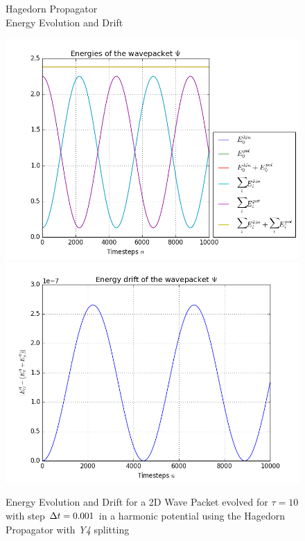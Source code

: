 \appendix

\begin{figure}
	\begin{minipage}[c]{\textwidth}
		\begin{center}
			\large Hagedorn Propagator \\[1mm]
			\normalsize Energy Evolution and Drift
			\vspace{4mm}
		\end{center}
	\end{minipage}
	\includegraphics[width=.45\textwidth]{figures/energy_Hagedorn.png}
	\includegraphics[width=.45\textwidth]{figures/drift_Hagedorn.png}
	\label{fig:energy_Hagedorn}
	\caption{Energy Evolution and Drift for a 2D Wave Packet evolved for $\tau = 10$ with step $\Delta t = 0.001$ in a harmonic potential using the Hagedorn Propagator with \emph{Y4} splitting}
\end{figure}

